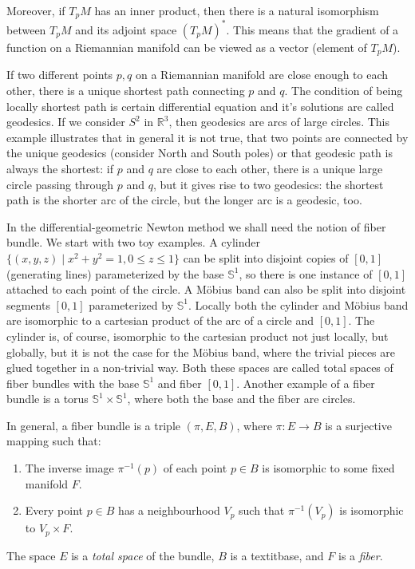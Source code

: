 Moreover, if $T_pM$ has an inner product, then there is a natural isomorphism
between $T_pM$ and its adjoint space $(T_pM)^*$. This means that the 
gradient of a function on a Riemannian manifold can be viewed as a vector (element
of $T_pM$).


If two different points $p, q$ on a Riemannian manifold are close enough to each other,
there is a unique shortest path connecting $p$ and $q$. 
The condition of being locally shortest path is certain differential equation
and it's solutions are called geodesics. If we consider $S^2$ in $\mathbb{R}^3$, 
then geodesics are arcs of large circles. This example illustrates that in general it is not true,
that two points are connected by the unique geodesics (consider North and South poles)
or that geodesic path is always the shortest: if $p$ and $q$ are close to each other,
there is a unique large circle passing through $p$ and $q$, but it gives rise to two
geodesics: the shortest path is the shorter arc of the circle, but the longer arc 
is a geodesic, too.


In the differential-geometric Newton method
we shall need the notion of fiber bundle.
We start with two toy examples.
A cylinder $ \{ (x, y, z) \mid x^2 + y^2 = 1, 0 \leq z \leq 1 \}$
can be split into disjoint copies of $[0,1]$ (generating lines)
parameterized by the base $\mathbb{S}^1$,
so there is one instance of $[0,1]$ attached to each point of the circle.
A M\"obius band can also be split into disjoint segments
$[0,1]$ parameterized by $\mathbb{S}^1$. Locally both the cylinder
and M\"obius band are isomorphic to a cartesian product
of the arc of a circle and $[0,1]$. The cylinder is, of course,
isomorphic to the cartesian product not just locally, but globally,
but it is not the case for the M\"obius band, where the trivial
 pieces are glued together in a non-trivial way. Both these spaces
are called total spaces of fiber bundles with the base $\mathbb{S}^1$ and fiber $[0,1]$.
Another example of a fiber bundle is a torus $\mathbb{S}^1 \times \mathbb{S}^1$,
where both the base and the fiber are circles. 

In general, a fiber bundle is a triple $( \pi, E, B)$, where
$ \pi \colon E \to B$ is a surjective mapping such that:
\begin{enumerate}
    \item The inverse image $\pi^{-1}(p)$ of each point $p \in B$ is 
    isomorphic to some fixed manifold $F$.
    \item Every point $p \in B$ has a neighbourhood $V_p$
    such that $\pi^{-1}(V_p)$ is isomorphic to $V_p \times F$.
\end{enumerate}
    The space $E$ is a \textit{total space} of the bundle, $B$ is a textit{base}, and $F$ is a \textit{fiber}.

